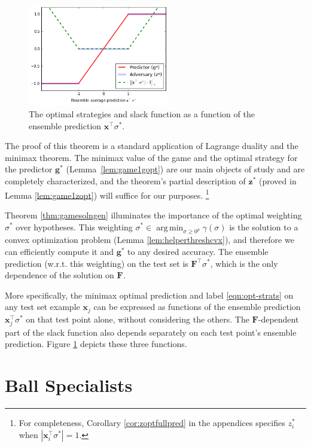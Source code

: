 \documentclass{article}
\DeclareMathOperator*{\argmin}{arg\,min}
\newcommand{\abs}[1]{\left| #1 \right|}
\newcommand{\vF}{\mathbf{F}}
\newcommand{\vx}{\mathbf{x}}
\newcommand{\vg}{\mathbf{g}}
\newcommand{\vz}{\mathbf{z}}
\begin{document}
\begin{figure}
\centering
\includegraphics[width=0.55\textwidth]{figs/optstrats.png}
\caption{
\label{fig:optstrats}
The optimal strategies and slack function as a function of the ensemble prediction $\vx^\top \sigma^*$.}
\end{figure}

The proof of this theorem is a standard application of Lagrange duality and the minimax theorem.
The minimax value of the game and the optimal strategy for the predictor $\vg^*$ (Lemma~\ref{lem:game1gopt}) 
are our main objects of study and are completely characterized, 
and the theorem's partial description of $\vz^*$ (proved in Lemma \ref{lem:game1zopt}) 
will suffice for our purposes. 
\footnote{For completeness, Corollary \ref{cor:zoptfullpred} in the appendices 
specifies $z_i^*$ when $\abs{\vx_{i}^\top \sigma^*} = 1$.}

Theorem \ref{thm:gamesolngen} illuminates the importance of the optimal weighting $\sigma^*$ over hypotheses. 
This weighting $\sigma^* \in \argmin_{\sigma \geq 0^p} \gamma (\sigma)$ is the solution 
to a convex optimization problem (Lemma \ref{lem:helperthreshcvx}), 
and therefore we can efficiently compute it and $\vg^*$ to any desired accuracy. 
The ensemble prediction (w.r.t. this weighting) on the test set is $\vF^\top \sigma^*$, 
which is the only dependence of the solution on $\vF$. 

More specifically, the minimax optimal prediction and label \eqref{eqn:opt-strats} on any test set example $\vx_j$ 
can be expressed as functions of the ensemble prediction $\vx_j^\top \sigma^*$ 
on that test point alone, without considering the others. 
The $\vF$-dependent part of the slack function also depends separately on each test point's ensemble prediction. 
Figure \ref{fig:optstrats} depicts these three functions. 

\section{Ball Specialists}
\end{document}
